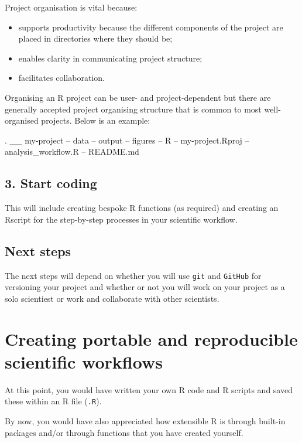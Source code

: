 \documentclass[
  12pt,
]{book}
\providecommand{\tightlist}{%
  \setlength{\itemsep}{0pt}\setlength{\parskip}{0pt}}
\begin{document}
Project organisation is vital because:

\begin{itemize}
\tightlist
\item
  supports productivity because the different components of the project are placed in directories where they should be;
\item
  enables clarity in communicating project structure;
\item
  facilitates collaboration.
\end{itemize}

Organising an R project can be user- and project-dependent but there are generally accepted project organising structure that is common to most well-organised projects. Below is an example:

.
\textbar\_\_ my-project
\textbar-- data
\textbar-- output
\textbar-- figures
\textbar-- R
\textbar-- my-project.Rproj
\textbar-- analysis\_workflow.R
\textbar-- README.md

\hypertarget{start-coding}{%
\section{3. Start coding}\label{start-coding}}

This will include creating bespoke R functions (as required) and creating an Rscript for the step-by-step processes in your scientific workflow.

\hypertarget{next-steps}{%
\section{Next steps}\label{next-steps}}

The next steps will depend on whether you will use \texttt{git} and \texttt{GitHub} for versioning your project and whether or not you will work on your project as a solo scientiest or work and collaborate with other scientists.

\hypertarget{portable-reproducible}{%
\chapter{Creating portable and reproducible scientific workflows}\label{portable-reproducible}}

At this point, you would have written your own R code and R scripts and saved these within an R file (\texttt{.R}).

By now, you would have also appreciated how extensible R is through built-in packages and/or through functions that you have created yourself.
\end{document}
